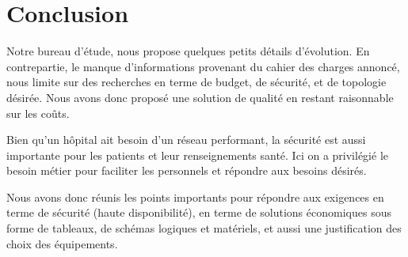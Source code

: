 \section*{Conclusion}

Notre bureau d'étude, nous propose quelques petits détails d'évolution.
En contrepartie, le manque d'informations provenant du cahier des charges annoncé, nous limite sur des recherches en terme de budget, de sécurité, et de topologie désirée.
Nous avons donc proposé une solution de qualité en restant raisonnable sur les coûts.

Bien qu'un hôpital ait besoin d'un réseau performant, la sécurité est aussi importante pour les patients et leur renseignements santé.
Ici on a privilégié le besoin métier pour faciliter les personnels et répondre aux besoins désirés.

Nous avons donc réunis les points importants pour répondre aux exigences en terme de sécurité (haute disponibilité), en terme de solutions économiques sous forme de tableaux, de schémas logiques et matériels, et aussi une justification des choix des équipements.

%
